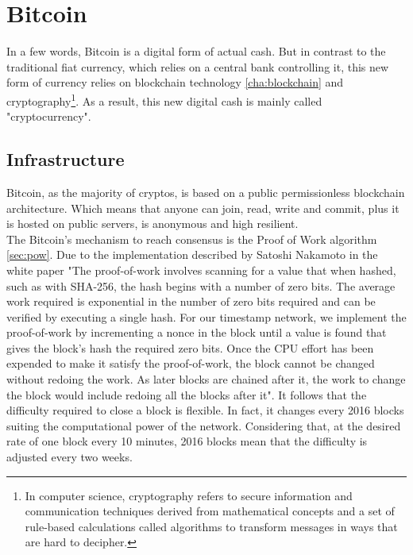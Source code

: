 \chapter{Bitcoin}
\label{cha:bitcoin}

In a few words, Bitcoin is a digital form of actual cash. But in contrast to the 
traditional fiat currency, which relies on a central bank controlling it, this new
form of currency relies on blockchain technology \ref{cha:blockchain} and 
cryptography\footnote{In computer science, cryptography refers to secure information and communication techniques derived from mathematical concepts and a set of rule-based calculations called algorithms to transform messages in ways that are hard to decipher.}.
As a result, this new digital cash is mainly called "cryptocurrency".

\section{Infrastructure}
\label{sec:Infrastructure}

Bitcoin, as the majority of cryptos, is based on a public permissionless blockchain architecture.
Which means that anyone can join, read, write and commit, plus it is hosted on public 
servers, is anonymous and high resilient. \\
The Bitcoin's mechanism to reach consensus is the Proof of Work algorithm \ref{sec:pow}.
Due to the implementation described by Satoshi Nakamoto in the white paper "The proof-of-work 
involves scanning for a value that when hashed, such as with SHA-256, the hash begins 
with a number of zero bits. The average work required is exponential in the number of 
zero bits required and can be verified by executing a single hash. For our timestamp 
network, we implement the proof-of-work by incrementing a nonce in the block until a 
value is found that gives the block's hash the required zero bits.   
Once the CPU effort   has   been   expended   to   make   it   satisfy   the   
proof-of-work,   the   block   cannot   be   changed without  redoing  the   work.    
As   later   blocks   are  chained   after  it,   the  work  to  change  the  
block would include redoing all the blocks after it"\cite{bitcoin}. It follows 
that the difficulty required to close a block is flexible. In fact, it changes every 
2016 blocks suiting the computational power of the network. Considering that, at the 
desired rate of one block every 10 minutes, 2016
blocks mean that the difficulty is adjusted every two weeks.

